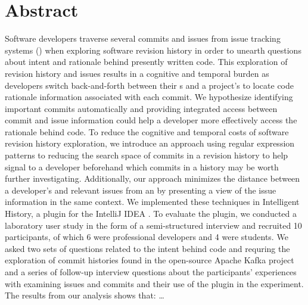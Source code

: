 
\chapter{Abstract}


Software developers traverse several commits and issues from issue tracking systems ()
when exploring software revision history in order to unearth questions about intent and rationale behind presently written code.
This exploration of revision history and issues results in a cognitive and temporal burden as developers
switch back-and-forth between their s and a project's  to locate code rationale information
associated with each commit.
We hypothesize identifying important commits automatically and providing integrated access between commit and issue information could help a developer more effectively access the rationale behind code.
To reduce the cognitive and temporal costs of software revision history exploration,
we introduce an approach using regular expression patterns to reducing the search space of commits in a revision history to help
signal to a developer beforehand which commits in a history may be worth further investigating.
Additionally, our approach minimizes the distance between a developer's  and relevant issues from an 
by presenting a view of the issue information in the same context.
We implemented these techniques in Intelligent History, a plugin for the IntelliJ IDEA .
To evaluate the plugin, we conducted a laboratory user study in the form of a semi-structured interview and 
recruited 10 participants, of which 6 were professional developers and 4 were students.
We asked two sets of questions related to the intent behind code and requring the exploration of 
commit histories found in the open-source Apache Kafka project and a series of follow-up interview questions about the participants'
experiences with examining issues and commits and their use of the plugin in the experiment.
The results from our analysis shows that: \dots

\vfill
\begin{center}
\begin{sf}
\end{sf}
\end{center}
